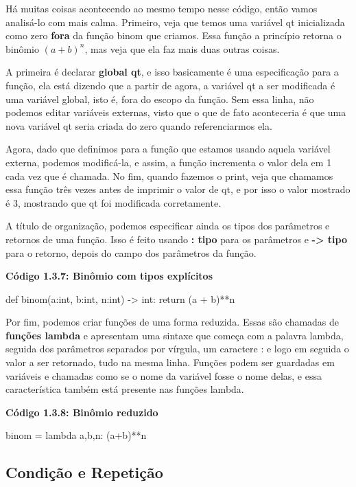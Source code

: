 \documentclass[11pt, a4paper]{article}
\begin{document}
Há muitas coisas acontecendo ao mesmo tempo nesse código, então vamos analisá-lo com mais calma. Primeiro, veja que temos uma variável qt inicializada como zero \textbf{fora} da função binom que criamos. Essa função a princípio retorna o binômio \((a+b)^n\), mas veja que ela faz mais duas outras coisas.

A primeira é declarar \textbf{global qt}, e isso basicamente é uma especificação para a função, ela está dizendo que a partir de agora, a variável qt a ser modificada é uma variável global, isto é, fora do escopo da função. Sem essa linha, não podemos editar variáveis externas, visto que o que de fato aconteceria é que uma nova variável qt seria criada do zero quando referenciarmos ela.

Agora, dado que definimos para a função que estamos usando aquela variável externa, podemos modificá-la, e assim, a função incrementa o valor dela em 1 cada vez que é chamada. No fim, quando fazemos o print, veja que chamamos essa função três vezes antes de imprimir o valor de qt, e por isso o valor mostrado é 3, mostrando que qt foi modificada corretamente.

A título de organização, podemos especificar ainda os tipos dos parâmetros e retornos de uma função. Isso é feito usando \textbf{: tipo} para os parâmetros e \textbf{-> tipo} para o retorno, depois do campo dos parâmetros da função.

\textbf{Código 1.3.7: Binômio com tipos explícitos}

\begin{code}
def binom(a:int, b:int, n:int) -> int:
    return (a + b)**n
\end{code}

Por fim, podemos criar funções de uma forma reduzida. Essas são chamadas de \textbf{funções lambda} e apresentam uma sintaxe que começa com a palavra lambda, seguida dos parâmetros separados por vírgula, um caractere : e logo em seguida o valor a ser retornado, tudo na mesma linha. Funções podem ser guardadas em variáveis e chamadas como se o nome da variável fosse o nome delas, e essa característica também está presente nas funções lambda.

\textbf{Código 1.3.8: Binômio reduzido}

\begin{code}
binom = lambda a,b,n: (a+b)**n
\end{code}

\subsection{Condição e Repetição}
\end{document}
